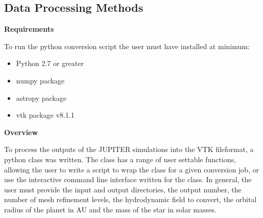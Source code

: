 \documentclass[twocolumn]{aastex62}
\begin{document}
\subsection{Data Processing Methods}\label{sec:code}
\textbf{Requirements}

To run the python conversion script the user must have installed at minimum:
\begin{itemize}
	\item Python 2.7 or greater
	\item numpy package
	\item astropy package
	\item vtk package v8.1.1
\end{itemize}

\textbf{Overview}

To process the outputs of the JUPITER simulations into the VTK fileformat, a python class was written. 
The class has a range of user settable functions, allowing the user to write a script to wrap the class for a given conversion job, or use the interactive command line interface written for the class.
In general, the user must provide the input and output directories, the output number, the number of mesh refinement levels, the hydrodynamic field to convert, the orbital radius of the planet in AU and the mass of the star in solar masses.
\end{document}
